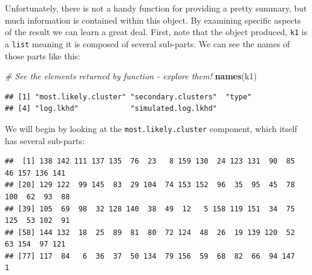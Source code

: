 \documentclass[
]{book}
\newenvironment{Shaded}{\begin{snugshade}}{\end{snugshade}}
\newcommand{\CommentTok}[1]{\textcolor[rgb]{0.56,0.35,0.01}{\textit{#1}}}
\newcommand{\FunctionTok}[1]{\textcolor[rgb]{0.13,0.29,0.53}{\textbf{#1}}}
\newcommand{\NormalTok}[1]{#1}
\newcommand{\SpecialCharTok}[1]{\textcolor[rgb]{0.81,0.36,0.00}{\textbf{#1}}}
\begin{document}
Unfortunately, there is not a handy function for providing a pretty summary, but much information is contained within this object. By examining specific aspects of the result we can learn a great deal. First, note that the object produced, \texttt{k1} is a \texttt{list} meaning it is composed of several sub-parts. We can see the names of those parts like this:

\begin{Shaded}
\begin{Highlighting}[]
\CommentTok{\# See the elements returned by function {-} explore them!}
\FunctionTok{names}\NormalTok{(k1) }
\end{Highlighting}
\end{Shaded}

\begin{verbatim}
## [1] "most.likely.cluster" "secondary.clusters"  "type"               
## [4] "log.lkhd"            "simulated.log.lkhd"
\end{verbatim}

We will begin by looking at the \texttt{most.likely.cluster} component, which itself has several sub-parts:

\begin{Shaded}
\end{Shaded}

\begin{verbatim}
##  [1] 138 142 111 137 135  76  23   8 159 130  24 123 131  90  85  46 157 136 141
## [20] 129 122  99 145  83  29 104  74 153 152  96  35  95  45  78 100  62  93  88
## [39] 105  69  98  32 128 140  38  49  12   5 158 119 151  34  75 125  53 102  91
## [58] 144 132  18  25  89  81  80  72 124  48  26  19 139 120  52  63 154  97 121
## [77] 117  84   6  36  37  50 134  79 156  59  68  82  66  94 147   1
\end{verbatim}

\begin{Shaded}
\end{Shaded}
\end{document}
